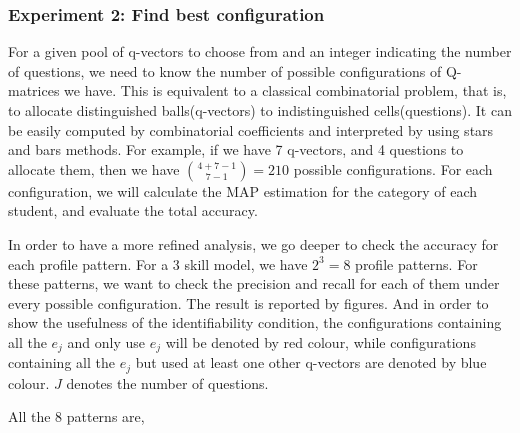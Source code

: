 \documentclass{edm_template}
\begin{document}
\subsubsection{Experiment 2: Find best configuration}
For a given pool of q-vectors to choose from and an integer indicating the number of questions, we need to know the number of possible configurations of Q-matrices we have. This is equivalent to a classical combinatorial problem, that is, to allocate distinguished balls(q-vectors) to indistinguished cells(questions). It can be easily computed by combinatorial coefficients and interpreted by using stars and bars methods. For example, if we have 7 q-vectors, and 4 questions to allocate them, then we have ${{4+7-1}\choose {7-1}}=210$ possible configurations. For each configuration, we will calculate the MAP estimation for the category of each student, and evaluate the total accuracy.

In order to have a more refined analysis, we go deeper to check the accuracy for each profile pattern. For a 3 skill model, we have $2^3=8$ profile patterns. For these patterns, we want to check the precision and recall for each of them under every possible configuration. The result is reported by figures. And in order to show the usefulness of the identifiability condition, the configurations containing all the ${e_j}$ and only use ${e_j}$ will be denoted by red colour, while configurations containing all the ${e_j}$ but used at least one other q-vectors are denoted by blue colour. $J$ denotes the number of questions.

All the 8 patterns are,
\end{document}
